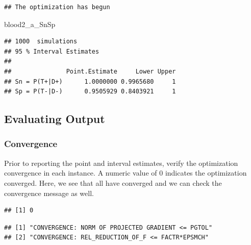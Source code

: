 \documentclass[
  12pt,
]{article}
\newenvironment{Shaded}{\begin{snugshade}}{\end{snugshade}}
\newcommand{\FunctionTok}[1]{\textcolor[rgb]{0.13,0.29,0.53}{\textbf{#1}}}
\newcommand{\NormalTok}[1]{#1}
\newcommand{\SpecialCharTok}[1]{\textcolor[rgb]{0.81,0.36,0.00}{\textbf{#1}}}
\begin{document}
\begin{verbatim}
## The optimization has begun
\end{verbatim}

\begin{Shaded}
\begin{Highlighting}[]
\NormalTok{blood2\_a\_SnSp}
\end{Highlighting}
\end{Shaded}

\begin{verbatim}
## 1000  simulations 
## 95 % Interval Estimates
## 
##               Point.Estimate     Lower Upper
## Sn = P(T+|D+)      1.0000000 0.9965680     1
## Sp = P(T-|D-)      0.9505929 0.8403921     1
\end{verbatim}

\subsection{Evaluating Output}\label{evaluating-output}

\subsubsection{Convergence}\label{convergence}

Prior to reporting the point and interval estimates, verify the
optimization convergence in each instance. A numeric value of 0
indicates the optimization converged. Here, we see that all have
converged and we can check the convergence message as well.

\begin{Shaded}
\end{Shaded}

\begin{verbatim}
## [1] 0
\end{verbatim}

\begin{Shaded}
\end{Shaded}

\begin{verbatim}
## [1] "CONVERGENCE: NORM OF PROJECTED GRADIENT <= PGTOL"
## [2] "CONVERGENCE: REL_REDUCTION_OF_F <= FACTR*EPSMCH"
\end{verbatim}
\end{document}

